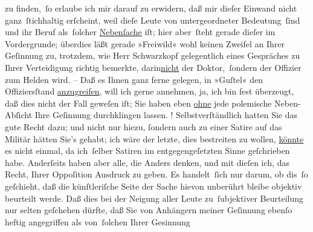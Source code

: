                zu finden, ſo erlaube ich mir darauf zu erwidern, daß mir dieſer Einwand nicht
               ganz ſtichhaltig erſcheint, weil dieſe Leute von untergeordneter Bedeutung ſind und
               ihr Beruf als ſolcher \uline{Nebenſache} iſt; hier aber ſteht
               gerade dieſer im Vordergrunde; überdies läßt gerade »Freiwild« wohl keinen Zweifel an Ihrer Geſinnung zu, trotzdem, wie Herr Schwarzkopf gelegentlich eines Gespräches zu
                Ihrer Verteidigung richtig {\pb}bemerkte, \introOben{}darin\introOben{}{ }\uline{nicht} der Doktor, ſondern der Offizier zum Helden
               wird. – Daß es Ihnen ganz ferne gelegen, in »Guſtel« den Offiziersſtand \uline{anzugreifen}, will
               ich gerne annehmen, ja, ich bin fest überzeugt, daß dies nicht der Fall geweſen iſt;
               Sie haben eben \uline{ohne} jede polemische Neben-Abſicht
               Ihre Geſinnung durchklingen lassen. \label{K_L04231-6v}\label{K_L04231-6}!
               Selbstverſtändlich hatten Sie das gute Recht dazu; und nicht nur hiezu,{ }ſondern auch
               zu einer Satire auf das Militär hätten Sie’s gehabt; ich wäre der letzte, dies
               bestreiten zu wollen, \uline{könnte} es nicht einmal, da
               ich ſelber Satiren im entgegengeſetzten Sinne geſchrieben habe. Anderſeits haben aber
               alle, die Anders denken, und mit dieſen ich, das Recht, Ihrer Oppoſition Ausdruck zu
               geben. Es handelt ſich nur darum, ob dis ſo geſchieht, daß  die künſtleriſche Seite der Sache {\pb}hievon unberührt bleibe {\kaufmannsund} objektiv beurteilt werde. Daß dies bei der Neigung
               aller Leute zu ſubjektiver Beurteilung nur selten geſchehen dürfte, daß Sie von
               Anhängern meiner Geſinnung ebenſo heftig angegriffen als von ſolchen Ihrer Gesinnung
